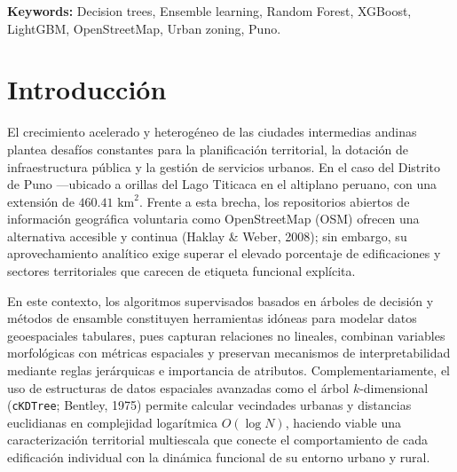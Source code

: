 \documentclass[11pt,a4paper]{article}
\begin{document}
\noindent\textbf{Keywords:} Decision trees, Ensemble learning, Random Forest, XGBoost, LightGBM, OpenStreetMap, Urban zoning, Puno.

\newpage

\section{Introducción}
\label{sec:introduccion}

El crecimiento acelerado y heterogéneo de las ciudades intermedias andinas plantea desafíos constantes para la planificación territorial, la dotación de infraestructura pública y la gestión de servicios urbanos. En el caso del Distrito de Puno —ubicado a orillas del Lago Titicaca en el altiplano peruano, con una extensión de $460.41\text{ km}^2$. Frente a esta brecha, los repositorios abiertos de información geográfica voluntaria como OpenStreetMap (OSM) ofrecen una alternativa accesible y continua (Haklay \& Weber, 2008); sin embargo, su aprovechamiento analítico exige superar el elevado porcentaje de edificaciones y sectores territoriales que carecen de etiqueta funcional explícita.

En este contexto, los algoritmos supervisados basados en árboles de decisión y métodos de ensamble constituyen herramientas idóneas para modelar datos geoespaciales tabulares, pues capturan relaciones no lineales, combinan variables morfológicas con métricas espaciales y preservan mecanismos de interpretabilidad mediante reglas jerárquicas e importancia de atributos. Complementariamente, el uso de estructuras de datos espaciales avanzadas como el árbol $k$-dimensional (\texttt{cKDTree}; Bentley, 1975) permite calcular vecindades urbanas y distancias euclidianas en complejidad logarítmica $O(\log N)$, haciendo viable una caracterización territorial multiescala que conecte el comportamiento de cada edificación individual con la dinámica funcional de su entorno urbano y rural.
\end{document}

